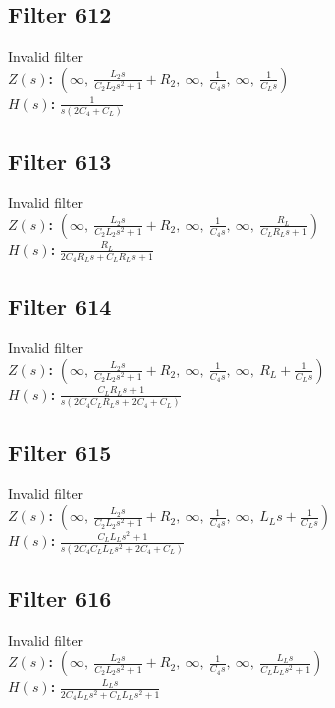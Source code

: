 \documentclass{article}
\begin{document}
\subsection*{Filter 612}
Invalid filter \\ 
\textbf{$Z(s)$:} $\left( \infty, \  \frac{L_{2} s}{C_{2} L_{2} s^{2} + 1} + R_{2}, \  \infty, \  \frac{1}{C_{4} s}, \  \infty, \  \frac{1}{C_{L} s}\right)$ \\ 
\textbf{$H(s)$:} $\frac{1}{s \left(2 C_{4} + C_{L}\right)}$ \\ 
\subsection*{Filter 613}
Invalid filter \\ 
\textbf{$Z(s)$:} $\left( \infty, \  \frac{L_{2} s}{C_{2} L_{2} s^{2} + 1} + R_{2}, \  \infty, \  \frac{1}{C_{4} s}, \  \infty, \  \frac{R_{L}}{C_{L} R_{L} s + 1}\right)$ \\ 
\textbf{$H(s)$:} $\frac{R_{L}}{2 C_{4} R_{L} s + C_{L} R_{L} s + 1}$ \\ 
\subsection*{Filter 614}
Invalid filter \\ 
\textbf{$Z(s)$:} $\left( \infty, \  \frac{L_{2} s}{C_{2} L_{2} s^{2} + 1} + R_{2}, \  \infty, \  \frac{1}{C_{4} s}, \  \infty, \  R_{L} + \frac{1}{C_{L} s}\right)$ \\ 
\textbf{$H(s)$:} $\frac{C_{L} R_{L} s + 1}{s \left(2 C_{4} C_{L} R_{L} s + 2 C_{4} + C_{L}\right)}$ \\ 
\subsection*{Filter 615}
Invalid filter \\ 
\textbf{$Z(s)$:} $\left( \infty, \  \frac{L_{2} s}{C_{2} L_{2} s^{2} + 1} + R_{2}, \  \infty, \  \frac{1}{C_{4} s}, \  \infty, \  L_{L} s + \frac{1}{C_{L} s}\right)$ \\ 
\textbf{$H(s)$:} $\frac{C_{L} L_{L} s^{2} + 1}{s \left(2 C_{4} C_{L} L_{L} s^{2} + 2 C_{4} + C_{L}\right)}$ \\ 
\subsection*{Filter 616}
Invalid filter \\ 
\textbf{$Z(s)$:} $\left( \infty, \  \frac{L_{2} s}{C_{2} L_{2} s^{2} + 1} + R_{2}, \  \infty, \  \frac{1}{C_{4} s}, \  \infty, \  \frac{L_{L} s}{C_{L} L_{L} s^{2} + 1}\right)$ \\ 
\textbf{$H(s)$:} $\frac{L_{L} s}{2 C_{4} L_{L} s^{2} + C_{L} L_{L} s^{2} + 1}$ \\ 
\end{document}
